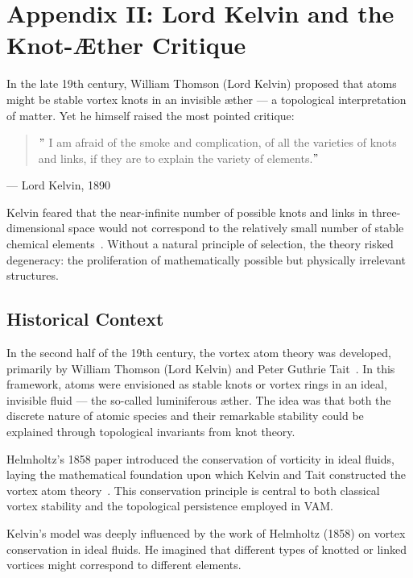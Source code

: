 \documentclass[preprint]{revtex4-2}
\begin{document}
\section*{Appendix II: Lord Kelvin and the Knot-Æther Critique}
\label{appendix:kelvin}

    In the late 19th century, William Thomson (Lord Kelvin) proposed that atoms might be stable vortex knots in an invisible æther — a topological interpretation of matter. Yet he himself raised the most pointed critique:

    \begin{quote}
    \("\) I am afraid of the smoke and complication, of all the varieties of knots and links, if they are to explain the variety of elements.\("\)
    \end{quote}
 \hfill  — Lord Kelvin, 1890

    Kelvin feared that the near-infinite number of possible knots and links in three-dimensional space would not correspond to the relatively small number of stable chemical elements~\cite{thomson1890knots, tait1877knots}. Without a natural principle of selection, the theory risked degeneracy: the proliferation of mathematically possible but physically irrelevant structures.

    \subsection*{Historical Context}

    In the second half of the 19th century, the vortex atom theory was developed, primarily by William Thomson (Lord Kelvin) and Peter Guthrie Tait~\cite{thomson1890knots, tait1877knots}. In this framework, atoms were envisioned as stable knots or vortex rings in an ideal, invisible fluid — the so-called luminiferous æther. The idea was that both the discrete nature of atomic species and their remarkable stability could be explained through topological invariants from knot theory.

    Helmholtz's 1858 paper introduced the conservation of vorticity in ideal fluids, laying the mathematical foundation upon which Kelvin and Tait constructed the vortex atom theory~\cite{helmholtz1858vortices}. This conservation principle is central to both classical vortex stability and the topological persistence employed in VAM.

    Kelvin's model was deeply influenced by the work of Helmholtz (1858) on vortex conservation in ideal fluids. He imagined that different types of knotted or linked vortices might correspond to different elements.
\end{document}
